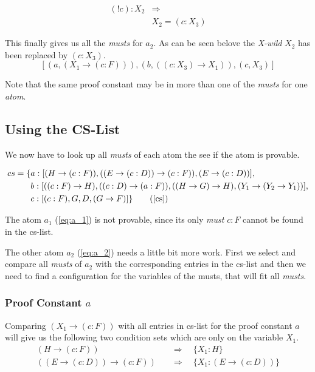 \begin{equation*}
	\begin{split}
		(! c) : X_2 & \Rightarrow \\
		& X_2 = (c:X_3)
	\end{split}	
\end{equation*}

This finally gives us all the \emph{musts} for $a_2$. As can be seen belove the \emph{X-wild} $X_2$ has been replaced by $(c:X_3)$.
\begin{equation}\label{eq:a2_musts}
	[(a, (X_1 \rightarrow (c:F))), (b, ((c:X_3) \rightarrow X_1)), (c, X_3)]
\end{equation}

Note that the same proof constant may be in more than one of the \emph{musts} for one \emph{atom}. 

\subsection{Using the CS-List}
We now have to look up all \emph{musts} of each atom the see if the atom is provable.

\begin{align*}
	cs = \{& a: [(H \rightarrow (c:F)), ((E \rightarrow (c:D)) \rightarrow (c:F)), (E \rightarrow (c:D))],\\
	& b: [((c:F) \rightarrow H), ((c:D) \rightarrow (a:F)), ((H \rightarrow G) \rightarrow H), (Y_1 \rightarrow (Y_2 \rightarrow Y_1))],\\
	& c: [(c:F), G, D, (G \rightarrow F)]\}
	\tag{\ref{cs}}
\end{align*}

The atom $a_1$ (\ref{eq:a_1}) is not provable, since its only \emph{must} $c:F$ cannot be found in the cs-list.

The other atom $a_2$ (\ref{eq:a_2}) needs a little bit more work. First we select and compare all \emph{musts} of $a_2$ with the corresponding entries in the cs-list and then we need to find a configuration for the variables of the musts, that will fit all \emph{musts}.

\subsubsection[look up proof constant a]{Proof Constant $a$}
Comparing $(X_1 \rightarrow (c:F))$ with all entries in cs-list for the proof constant $a$ will give us the following two condition sets which are only on the variable $X_1$.
\begin{align}
	(H \rightarrow (c:F)) & \quad \Rightarrow \quad \{X_1: H\} \\ 
	((E \rightarrow (c:D)) \rightarrow (c:F)) & \quad \Rightarrow  \quad \{X_1: (E \rightarrow (c:D))\} \label{condition:a}
\end{align}

